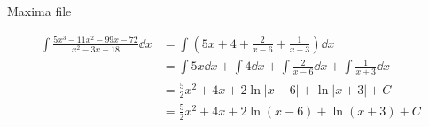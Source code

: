 \documentclass{tufte-handout}
\begin{document}
\begin{question}
\qpart
Maxima file

\qpart

\begin{align*}
\int \frac{5x^{3} - 11x^{2} - 99x - 72}{x^{2} - 3x - 18} \dd{x} &= \int \left(5x + 4 + \frac{2}{x - 6} + \frac{1}{x + 3}\right) \dd{x}\\[8pt]
&= \int 5x \dd{x} + \int 4 \dd{x} + \int \frac{2}{x - 6} \dd{x} + \int \frac{1}{x + 3} \dd{x}\\[8pt]
&= \frac{5}{2}x^{2} + 4x + 2\ln|x - 6| + \ln|x + 3| + C\\[8pt]
&= \frac{5}{2}x^{2} + 4x + 2\ln(x - 6) + \ln(x + 3) + C
\end{align*}

\end{question}
\end{document}
